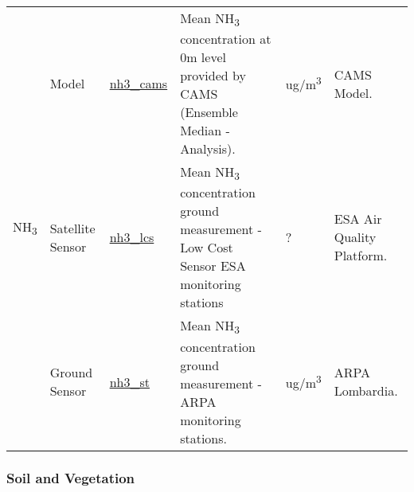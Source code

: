 \begin{center}
\begin{longtable}{ |p{2cm}|p{1.5cm}|p{2.3cm}|p{4cm}|p{1cm}|p{2cm}| }
\multirow{3}{4em}{NH\textsubscript{3}} & Model  & \underline{nh3\_cams} & Mean NH\textsubscript{3} concentration at 0m level provided by CAMS  (Ensemble Median - Analysis). & ug/m\textsuperscript{3} & CAMS Model.\\ 
& Satellite \newline Sensor  & \underline{nh3\_lcs} &  Mean NH\textsubscript{3} concentration ground measurement - Low Cost Sensor ESA monitoring stations  & ? & ESA Air Quality Platform.\\ 
& Ground \newline Sensor & \underline{nh3\_st} &  Mean NH\textsubscript{3} concentration ground measurement - ARPA monitoring stations.  & ug/m\textsuperscript{3} & ARPA \newline Lombardia.\\ \hline

\end{longtable}
\end{center}

\subsubsection{Soil and Vegetation}

